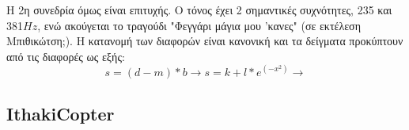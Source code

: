 \documentclass[a4paper,10pt]{article}
\begin{document}
Η 2η συνεδρία όμως είναι επιτυχής. Ο τόνος έχει 2 σημαντικές συχνότητες, 235 και 381$Hz$, ενώ ακούγεται το τραγούδι "Φεγγάρι μάγια μου 'κανες" (σε εκτέλεση Μπιθικώτση;).
Η κατανομή των διαφορών είναι κανονική και τα δείγματα προκύπτουν από τις διαφορές ως εξής:
$$s= (d-m)*b \rightarrow s= k+l*e^(-x^2) \rightarrow $$


\subsection{\foreignlanguage{english}{IthakiCopter}}
\end{document}
